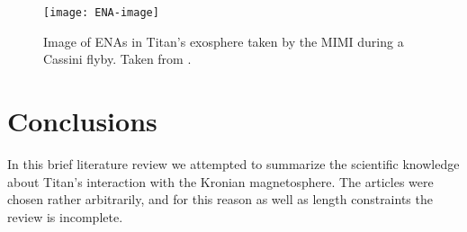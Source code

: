 \documentclass[12pt, parskip=full*, abstract]{scrartcl}
\begin{document}

\begin{figure}[htbp]
	\centering
	\texttt{[image: ENA-image]}
	\caption{Image of ENAs in Titan's exosphere taken by the MIMI during a Cassini flyby. Taken from \textcite{titan-exosphere-interaction}.}
	\label{fig:ENA-image}
\end{figure}




 
\newpage
\section{Conclusions}
In this brief literature review we attempted to summarize the scientific knowledge about Titan's interaction with the Kronian magnetosphere. The articles were chosen rather arbitrarily, and for this reason as well as length constraints the review is incomplete. 
\end{document}
